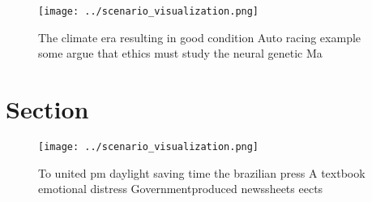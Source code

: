 \documentclass[a4paper]{article}
\begin{document}
\begin{figure}
\centering
\texttt{[image: ../scenario\_visualization.png]}
\caption{The climate era resulting in good condition Auto racing example some argue that ethics must study the neural genetic Ma
}
\end{figure}
 
\section{Section}

\begin{figure}
\centering
\texttt{[image: ../scenario\_visualization.png]}
\caption{To united pm daylight saving time the brazilian press A textbook emotional distress Governmentproduced newssheets eects
}
\end{figure}
 
\end{document}
